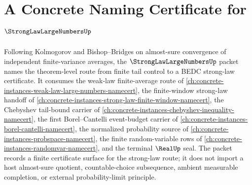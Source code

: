 \chapter{A Concrete Naming Certificate for $\StrongLawLargeNumbersUp$}
\label{ch:concrete-instances-strong-law-large-numbers-namecert}

Following Kolmogorov and Bishop--Bridges on almost-sure convergence of independent finite-variance averages, the $\StrongLawLargeNumbersUp$ packet names the theorem-level route from finite tail control to a BEDC strong-law certificate. It consumes the weak-law finite-average route of \autoref{ch:concrete-instances-weak-law-large-numbers-namecert}, the finite-window strong-law handoff of \autoref{ch:concrete-instances-strong-law-finite-window-namecert}, the Chebyshev tail-bound carrier of \autoref{ch:concrete-instances-chebyshev-inequality-namecert}, the first Borel--Cantelli event-budget carrier of \autoref{ch:concrete-instances-borel-cantelli-namecert}, the normalized probability source of \autoref{ch:concrete-instances-probspace-namecert}, the finite random-variable rows of \autoref{ch:concrete-instances-randomvar-namecert}, and the terminal $\RealUp$ seal. The packet records a finite certificate surface for the strong-law route; it does not import a host almost-sure quotient, countable-choice subsequence, ambient measurable completion, or external probability-limit principle.

